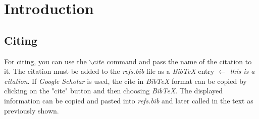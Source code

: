 \chapter{Introduction}
\label{chap:1_introduction}

\lipsum[2-4]

\section{Citing}
For citing, you can use the $\backslash cite{}$ command and pass the name of the citation to it. The citation must be added to the \textit{refs.bib} file as a \textit{BibTeX} entry \cite{beeton2017debugging} $\leftarrow$ \textit{this is a citation}. If \textit{Google Scholar} is used, the cite in \textit{BibTeX} format can be copied by clicking on the "cite" button and then choosing \textit{BibTeX}. The displayed information can be copied and pasted into \textit{refs.bib} and later called in the text as previously shown.
